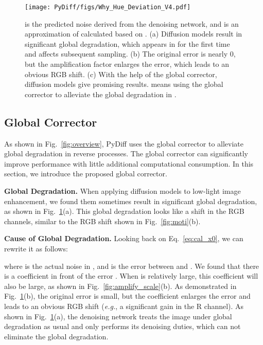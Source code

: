 \documentclass{article}
\def\eg{\emph{e.g.}}
\begin{document}
\begin{figure}[tb]
\begin{center}
        \texttt{[image: PyDiff/figs/Why\_Hue\_Deviation\_V4.pdf]}
\end{center}
    
   \caption{ is the predicted noise derived from the denoising network, and   is an approximation of  calculated based on . (a) Diffusion models result in significant global degradation, which appears in  for the first time and affects subsequent sampling. (b) The original error  is nearly 0, but the amplification factor  enlarges the error, which leads to an obvious RGB shift. (c) With the help of the global corrector, diffusion models give promising results.  means using the global corrector to alleviate the global degradation in .} 
\label{fig:whyHue}
  \end{figure}


  
\subsection{Global Corrector}
As shown in Fig.~\ref{fig:overview}, PyDiff uses the global corrector to alleviate global degradation in reverse processes. The global corrector can significantly improve performance with little additional computational consumption. In this section, we introduce the proposed global corrector.

\noindent \textbf{Global Degradation.}
When applying diffusion models to low-light image enhancement, we found them sometimes result in significant global degradation, as shown in Fig.~\ref{fig:whyHue}(a). This global degradation looks like a shift in the RGB channels, similar to the RGB shift shown in Fig.~\ref{fig:moti}(b).

\noindent \textbf{Cause of Global Degradation.}
\label{sec:cause}
Looking back on Eq.~\eqref{eq:cal_x0}, we can rewrite it as follows:
\begin{linenomath}

\end{linenomath}
where  is the actual noise in , and  is the error between  and . We found that there is a coefficient  in front of the error . When  is relatively large, this coefficient will also be large, as shown in Fig.~\ref{fig:amplify_scale}(b). As demonstrated in Fig.~\ref{fig:whyHue}(b), the original error  is small, but the coefficient  enlarges the error and leads to an obvious RGB shift (\eg, a significant gain in the R channel). As shown in Fig.~\ref{fig:whyHue}(a), the denoising network treats the image under global degradation as usual and only performs its denoising duties, which can not eliminate the global degradation.
\end{document}
